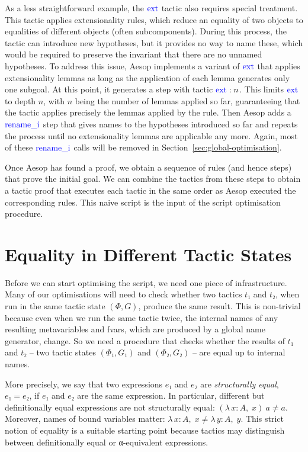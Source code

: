 \documentclass[sigplan,10pt,anonymous,review]{acmart}
\newcommand{\tac}[1]{\ensuremath{\mathrm{\mathcolor{blue}{#1}}}}
\newcommand{\Lam}[2]{λ\,#1,\; #2}
\begin{document}
As a less straightforward example, the \tac{ext} tactic also requires special treatment.
This tactic applies extensionality rules, which reduce an equality of two objects to equalities of different objects (often subcomponents).
During this process, the tactic can introduce new hypotheses, but it provides no way to name these, which would be required to preserve the invariant that there are no unnamed hypotheses.
To address this issue, Aesop implements a variant of \tac{ext} that applies extensionality lemmas as long as the application of each lemma generates only one subgoal.
At this point, it generates a step with tactic $\tac{ext} : n$.
This limits \tac{ext} to depth $n$, with $n$ being the number of lemmas applied so far, guaranteeing that the tactic applies precisely the lemmas applied by the rule.
Then Aesop adds a \tac{rename\_i} step that gives names to the hypotheses introduced so far and repeats the process until no extensionality lemmas are applicable any more.
Again, most of these \tac{rename\_i} calls will be removed in Section~\ref{sec:global-optimisation}.

\medskip

Once Aesop has found a proof, we obtain a sequence of rules (and hence steps) that prove the initial goal.
We can combine the tactics from these steps to obtain a tactic proof that executes each tactic in the same order as Aesop executed the corresponding rules.
This naive script is the input of the script optimisation procedure.

\section{Equality in Different Tactic States}%
\label{sec:equality}

Before we can start optimising the script, we need one piece of infrastructure.
Many of our optimisations will need to check whether two tactics $t₁$ and $t₂$, when run in the same tactic state $(Φ, G)$, produce the same result.
This is non-trivial because even when we run the same tactic twice, the internal names of any resulting metavariables and fvars, which are produced by a global name generator, change.
So we need a procedure that checks whether the results of $t₁$ and $t₂$ -- two tactic states $(Φ₁, G₁)$ and $(Φ₂, G₂)$ -- are equal up to internal names.

More precisely, we say that two expressions $e₁$ and $e₂$ are \emph{structurally equal}, $e₁ = e₂$, if $e₁$ and $e₂$ are the same expression.
In particular, different but definitionally equal expressions are not structurally equal: $(\Lam{x : A}{x})~a ≠ a$.
Moreover, names of bound variables matter: $\Lam{x : A}{x} ≠ \Lam{y : A}{y}$.
This strict notion of equality is a suitable starting point because tactics may distinguish between definitionally equal or α-equivalent expressions.
\end{document}
